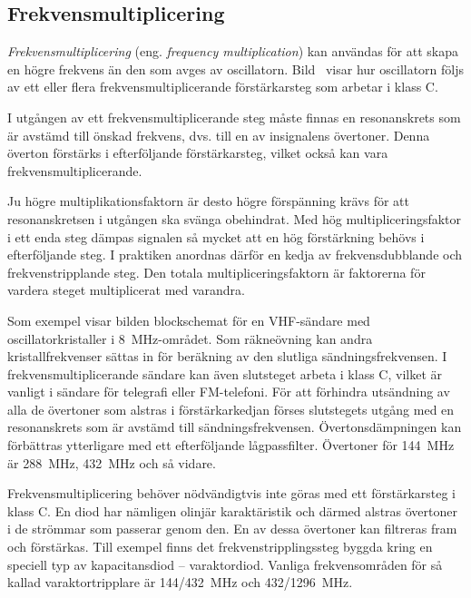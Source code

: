 \subsection{Frekvensmultiplicering}


\emph{Frekvensmultiplicering} (eng. \emph{frequency multiplication}) kan
användas för att skapa en högre frekvens än den som avges av oscillatorn.
Bild~ visar hur oscillatorn följs av ett eller flera
frekvensmultiplicerande förstärkarsteg som arbetar i klass C.

I utgången av ett frekvensmultiplicerande steg måste finnas en resonanskrets som
är avstämd till önskad frekvens, dvs. till en av insignalens övertoner.
Denna överton förstärks i efterföljande förstärkarsteg, vilket också kan vara
frekvensmultiplicerande.

Ju högre multiplikationsfaktorn är desto högre förspänning krävs för
att resonanskretsen i utgången ska svänga obehindrat.
Med hög multipliceringsfaktor i ett enda steg dämpas signalen så mycket att
en hög förstärkning behövs i efterföljande steg.
I praktiken anordnas därför en kedja av frekvensdubblande och
frekvenstripplande steg.
Den totala multipliceringsfaktorn är faktorerna för vardera steget
multiplicerat med varandra.

Som exempel visar bilden blockschemat för en VHF-sändare med
oscillatorkristaller i \qty{8}{\mega\hertz}-området.
Som räkneövning kan andra kristallfrekvenser sättas in för beräkning av den
slutliga sändningsfrekvensen.
I frekvensmultiplicerande sändare kan även slutsteget arbeta i klass C, vilket
är vanligt i sändare för telegrafi eller FM-telefoni.
För att förhindra utsändning av alla de övertoner som alstras i
förstärkarkedjan förses slutstegets utgång med en resonanskrets som är
avstämd till sändningsfrekvensen.
Övertonsdämpningen kan förbättras ytterligare med ett efterföljande
lågpassfilter.
Övertoner för \qty{144}{\mega\hertz} är \qty{288}{\mega\hertz},
\qty{432}{\mega\hertz} och så vidare.

Frekvensmultiplicering behöver nödvändigtvis inte göras med ett förstärkarsteg
i klass C.
En diod har nämligen olinjär karaktäristik och därmed alstras övertoner i
de strömmar som passerar genom den.
En av dessa övertoner kan filtreras fram och förstärkas.
Till exempel finns det frekvenstripplingssteg byggda kring en speciell typ av
kapacitansdiod -- varaktordiod.
Vanliga frekvensområden för så kallad varaktortripplare är
144/\qty{432}{\mega\hertz} och 432/\qty{1296}{\mega\hertz}.

